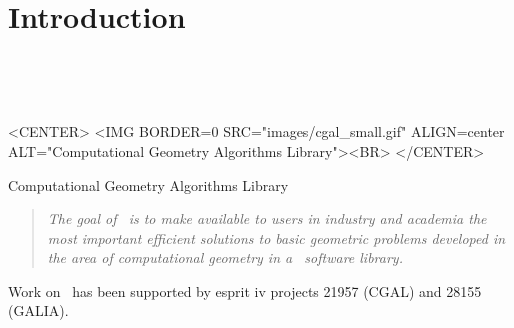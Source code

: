 
\chapter{Introduction}
\label{chap:intro}
 \\

\begin{ccTexOnly}
\begin{center}
{}\\
\end{center}
\end{ccTexOnly}

\begin{ccHtmlOnly}
<CENTER>
<IMG BORDER=0 SRC="images/cgal_small.gif" ALIGN=center ALT="Computational Geometry Algorithms Library"><BR>
</CENTER>
\end{ccHtmlOnly}
\centerline{{\sc Computational Geometry Algorithms Library}}


\begin{quote}
{\em The goal of \cgal\ is to make available to users in industry and academia
the most important efficient solutions to basic geometric problems
developed in the area of computational geometry in a \CC\ software library.}
\end{quote}

Work on \cgal\ has been supported by {\sc esprit iv} projects 21957 (CGAL) and
28155 (GALIA).


\InternalOnly{

}







